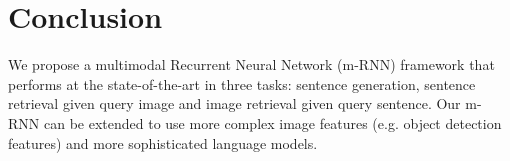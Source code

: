 \vspace{-1em}
\section{Conclusion}
\vspace{-1em}

We propose a multimodal Recurrent Neural Network (m-RNN) framework that performs at the state-of-the-art in three tasks: sentence generation, sentence retrieval given query image and image retrieval given query sentence.
Our m-RNN can be extended to use more complex image features (e.g. object detection features) and more sophisticated language models.
